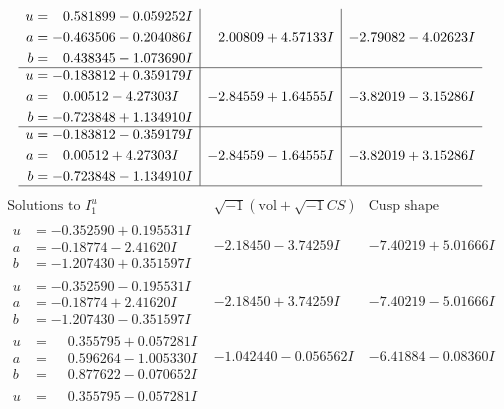 \documentclass[1p]{elsarticle_modified}
\theoremstyle{definition}
\newcommand{\I}{\sqrt{-1}}
\begin{document}
$$\begin{array}{c|c|c}
\begin{aligned}
u &= \phantom{-}0.581899 - 0.059252 I \\
a &= -0.463506 - 0.204086 I \\
b &= \phantom{-}0.438345 - 1.073690 I\end{aligned}
 & \phantom{-}2.00809 + 4.57133 I & -2.79082 - 4.02623 I \\ \hline\begin{aligned}
u &= -0.183812 + 0.359179 I \\
a &= \phantom{-}0.00512 - 4.27303 I \\
b &= -0.723848 + 1.134910 I\end{aligned}
 & -2.84559 + 1.64555 I & -3.82019 - 3.15286 I \\ \hline\begin{aligned}
u &= -0.183812 - 0.359179 I \\
a &= \phantom{-}0.00512 + 4.27303 I \\
b &= -0.723848 - 1.134910 I\end{aligned}
 & -2.84559 - 1.64555 I & -3.82019 + 3.15286 I\\
 \hline 
 \end{array}$$\newpage$$\begin{array}{c|c|c}  
\text{Solutions to }I^u_{1}& \I (\text{vol} + \sqrt{-1}CS) & \text{Cusp shape}\\
 \hline 
\begin{aligned}
u &= -0.352590 + 0.195531 I \\
a &= -0.18774 - 2.41620 I \\
b &= -1.207430 + 0.351597 I\end{aligned}
 & -2.18450 - 3.74259 I & -7.40219 + 5.01666 I \\ \hline\begin{aligned}
u &= -0.352590 - 0.195531 I \\
a &= -0.18774 + 2.41620 I \\
b &= -1.207430 - 0.351597 I\end{aligned}
 & -2.18450 + 3.74259 I & -7.40219 - 5.01666 I \\ \hline\begin{aligned}
u &= \phantom{-}0.355795 + 0.057281 I \\
a &= \phantom{-}0.596264 - 1.005330 I \\
b &= \phantom{-}0.877622 - 0.070652 I\end{aligned}
 & -1.042440 - 0.056562 I & -6.41884 - 0.08360 I \\ \hline\begin{aligned}
u &= \phantom{-}0.355795 - 0.057281 I \\

\end{aligned}
\end{array}$$
\end{document}
